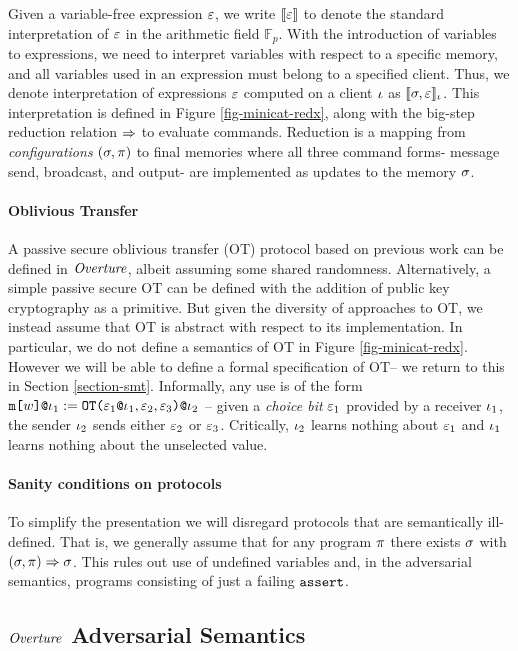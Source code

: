 Given a variable-free expression $\varepsilon$, we write $\llbracket \varepsilon \rrbracket$ to denote
the standard interpretation of $\varepsilon$ in the arithmetic field
$\mathbb{F}_{p}$. With the introduction of variables to expressions,
we need to interpret variables with respect to a specific memory, and
all variables used in an expression must belong to a specified client.
Thus, we denote interpretation of expressions $\varepsilon$ computed on a
client $\iota$ as $\llbracket \sigma,\varepsilon \rrbracket_{\iota}$. This interpretation is
defined in Figure \ref{fig-minicat-redx}, along with the big-step
reduction relation $\Rightarrow$ to evaluate commands. Reduction is a mapping
from \emph{configurations} $(\sigma,\pi)$ to final memories
where all three command forms- message send, broadcast, and
output- are implemented as updates to the memory $\sigma$. 


\paragraph{Oblivious Transfer} A passive secure oblivious transfer (OT) protocol
based on previous work \cite{barthe2019probabilistic} can be defined
in $\mathit{Overture}$, albeit assuming some shared randomness. Alternatively,
a simple passive secure OT can be defined with the addition of public
key cryptography as a primitive. But given the diversity of approaches
to OT, we instead assume that OT is abstract with respect to its
implementation. In particular, we do not define a semantics of OT in
Figure \ref{fig-minicat-redx}. However we will be able to define a
formal specification of OT-- we return to this in Section
\ref{section-smt}. Informally, any use is of the form $\texttt{m[}w\texttt{]}\texttt{@}\iota_1
:= \texttt{OT(}\varepsilon_1\texttt{@}\iota_1,\varepsilon_2,\varepsilon_3 \texttt{)}\texttt{@}\iota_2$ -- given a
\emph{choice bit} $\varepsilon_1$ provided by a receiver $\iota_1$, the sender
$\iota_2$ sends either $\varepsilon_2$ or $\varepsilon_3$. Critically, $\iota_2$ learns
nothing about $\varepsilon_1$ and $\iota_1$ learns nothing about the unselected
value.

\paragraph{Sanity conditions on protocols} To simplify
the presentation we will disregard protocols that are semantically
ill-defined. That is, we generally assume that for any
program $\pi$ there exists $\sigma$
with $(\sigma, \pi) \Rightarrow \sigma$. This rules out
use of undefined variables and, in the adversarial semantics,
programs consisting of just a failing $\texttt{assert}$.

\subsection{$\mathit{Overture}$ Adversarial Semantics}
  
